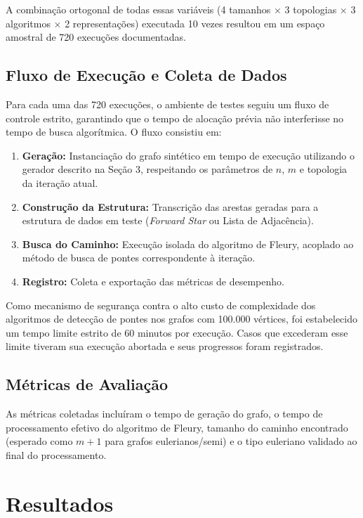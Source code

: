 \documentclass[12pt]{article}
\begin{document}
A combinação ortogonal de todas essas variáveis (4 tamanhos $\times$ 3 topologias $\times$ 3 algoritmos $\times$ 2 representações) executada 10 vezes resultou em um espaço amostral de 720 execuções documentadas.

\subsection{Fluxo de Execução e Coleta de Dados}

Para cada uma das 720 execuções, o ambiente de testes seguiu um fluxo de controle estrito, garantindo que o tempo de alocação prévia não interferisse no tempo de busca algorítmica. O fluxo consistiu em:

\begin{enumerate}
    \item \textbf{Geração:} Instanciação do grafo sintético em tempo de execução utilizando o gerador descrito na Seção 3, respeitando os parâmetros de $n$, $m$ e topologia da iteração atual.
    \item \textbf{Construção da Estrutura:} Transcrição das arestas geradas para a estrutura de dados em teste (\textit{Forward Star} ou Lista de Adjacência).
    \item \textbf{Busca do Caminho:} Execução isolada do algoritmo de Fleury, acoplado ao método de busca de pontes correspondente à iteração.
    \item \textbf{Registro:} Coleta e exportação das métricas de desempenho.
\end{enumerate}

Como mecanismo de segurança contra o alto custo de complexidade dos algoritmos de detecção de pontes nos grafos com 100.000 vértices, foi estabelecido um tempo limite estrito de 60 minutos por execução. Casos que excederam esse limite tiveram sua execução abortada e seus progressos foram registrados.

\subsection{Métricas de Avaliação}

As métricas coletadas incluíram o tempo de geração do grafo, o tempo de processamento efetivo do algoritmo de Fleury, tamanho do caminho encontrado (esperado como $m+1$ para grafos eulerianos/semi) e o tipo euleriano validado ao final do processamento.

\section{Resultados} \label{resultados}
\end{document}
